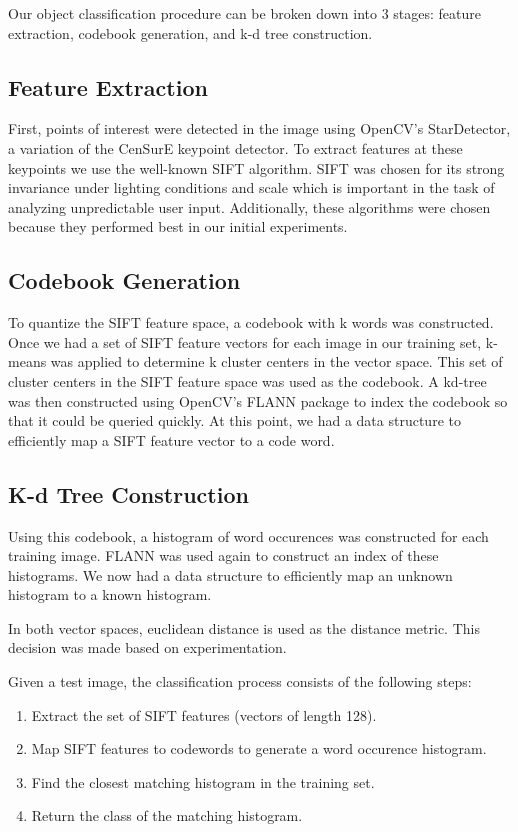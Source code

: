 Our object classification procedure can be broken down into 3 stages: feature
extraction, codebook generation, and k-d tree construction.

\subsection{Feature Extraction}
First, points of interest were detected in the image using OpenCV's StarDetector,
a variation of the CenSurE keypoint detector. To extract features at these
keypoints we use the well-known SIFT algorithm. SIFT was chosen for its strong
invariance under lighting conditions and scale which is important in the task of
analyzing unpredictable user input. Additionally, these algorithms were chosen
because they performed best in our initial experiments.

\subsection{Codebook Generation}
To quantize the SIFT feature space, a codebook with k words was constructed.
Once we had a set of SIFT feature vectors for each image in our training set,
k-means was applied to determine k cluster centers in the vector space. This set
of cluster centers in the SIFT feature space was used as the codebook. A kd-tree
was then constructed using OpenCV's FLANN package to index the codebook so that
it could be queried quickly. At this point, we had a data structure to
efficiently map a SIFT feature vector to a code word.

\subsection{K-d Tree Construction}
Using this codebook, a histogram of word occurences was constructed for each
training image. FLANN was used again to construct an
index of these histograms. We now had a data structure to efficiently map an
unknown histogram to a known histogram.

In both vector spaces, euclidean distance is used as the distance metric. This
decision was made based on experimentation.

Given a test image, the classification process consists of the following steps:
\begin{enumerate}
\item Extract the set of SIFT features (vectors of length 128).

\item Map SIFT features to codewords to generate a word occurence histogram.

\item Find the closest matching histogram in the training set.

\item Return the class of the matching histogram.
\end{enumerate}

